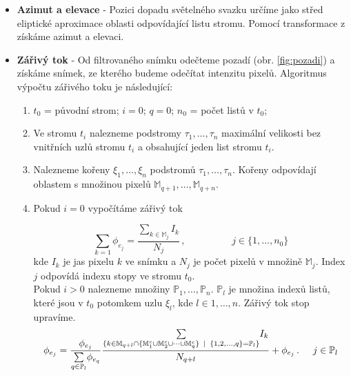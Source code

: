 \begin{itemize}
	\item \textbf{Azimut a elevace} - Pozici dopadu světelného svazku určíme jako střed eliptické aproximace oblasti odpovídající listu stromu. Pomocí transformace z \cite{Drapela} získáme azimut a elevaci.
	
	\item \textbf{Zářivý tok} - 
	Od filtrovaného snímku odečteme pozadí (obr. \ref{fig:pozadi}) a získáme snímek, ze kterého budeme odečítat intenzitu pixelů. Algoritmus výpočtu zářivého toku je následující:
	\begin{enumerate}
	\item $t_0$ = původní strom; $i = 0$; $q = 0$; $n_0$ = počet listů v $t_0$;
	
	\item Ve stromu $t_i$ nalezneme podstromy $\tau_1,\dots,\tau_n$ maximální velikosti bez vnitřních uzlů stromu $t_i$ a obsahující jeden list stromu $t_i$.  
	
	\item Nalezneme kořeny $\xi_1,\dots,\xi_n$ podstromů $\tau_1,\dots,\tau_n$. Kořeny odpovídají oblastem s množinou pixelů $\mathbb{M}_{q+1},\dots,\mathbb{M}_{q+n}$.
	
	\item Pokud $i = 0$ vypočítáme zářivý tok 
	
	\begin{equation}
	\underset{{k = 1}}{\sum}
	\phi_{e_j} = \frac{\underset{k\in\mathbb{M}_j}{\sum}I_k}{N_j}\,,\hspace{2cm} j\in\lbrace1,\dots,n_0\rbrace
	\end{equation}
	kde $I_k$ je jas pixelu $k$ ve snímku a $N_j$ je počet pixelů v množině $\mathbb{M}_j$. Index $j$ odpovídá indexu stopy ve stromu $t_0$.\\
	
	Pokud $i > 0$ nalezneme množiny $\mathbb{P}_1,\dots,\mathbb{P}_n$. $\mathbb{P}_l$ je množina indexů listů, které jsou v $t_0$ potomkem uzlu $\xi_l$, kde $l\in {1,\dots,n}$. Zářivý tok stop upravíme.  
	 \begin{equation}
	\phi_{e_j} = \frac{\phi_{e_j}}{\underset{q\in \mathbb{P}_l}{\sum}\phi_{e_q}}\frac{\underset{{\lbrace k\in\mathbb{M}_{q+l}\cap\lbrace \mathbb{M}_1^c \cup \mathbb{M}_2^c \cup \dots \cup \mathbb{M}_q^c \rbrace\hspace{1.5mm}|\hspace{1.5mm} \lbrace1,2,\dots,q\rbrace = \mathbb{P}_l \rbrace}}{\sum} I_k}{N_{q+l}} + \phi_{e_j}\,.\hspace{0.5cm} j\in \mathbb{P}_l
	\end{equation}
	

\end{enumerate}
\end{itemize}
